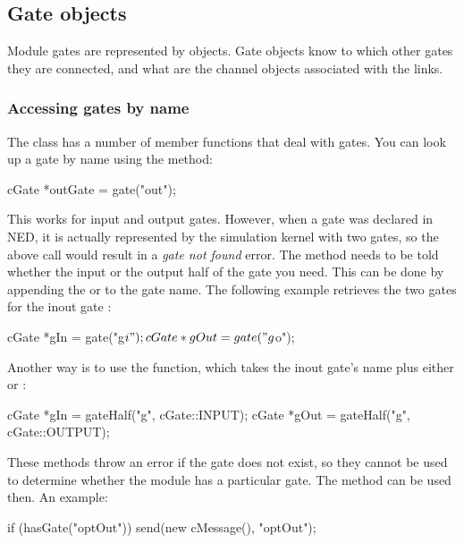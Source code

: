 \subsection{Gate objects}

Module gates are represented by  objects.
Gate objects know to which other gates they are connected, and
what are the channel objects associated with the links.

\subsubsection{Accessing gates by name}

The  class has a number of member functions that
deal with gates. You can look up a gate by name using the 
method:

\begin{cpp}
cGate *outGate = gate("out");
\end{cpp}

This works for input and output gates. However, when a gate was declared
 in NED, it is actually represented by the simulation kernel
with two gates, so the above call would result in a \textit{gate not found}
error. The  method needs to be told whether the input or
the output half of the gate you need. This can be done by appending
the  or  to the gate name. The following example
retrieves the two gates for the inout gate :

\begin{cpp}
cGate *gIn = gate("g$i");
cGate *gOut = gate("g$o");
\end{cpp}

Another way is to use the  function, which takes
the inout gate's name plus either  or :

\begin{cpp}
cGate *gIn = gateHalf("g", cGate::INPUT);
cGate *gOut = gateHalf("g", cGate::OUTPUT);
\end{cpp}

These methods throw an error if the gate does not exist, so they cannot
be used to determine whether the module has a particular gate.
The  method can be used then. An example:

\begin{cpp}
if (hasGate("optOut"))
   send(new cMessage(), "optOut");
\end{cpp}

